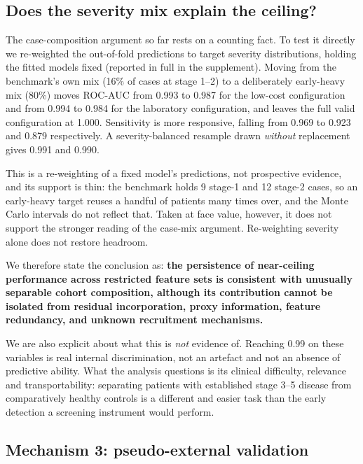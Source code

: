 \documentclass[conference]{IEEEtran}
\begin{document}
\subsection{Does the severity mix explain the ceiling?}
\label{sec:mixsim}

The case-composition argument so far rests on a counting fact. To test it
directly we re-weighted the out-of-fold predictions to target severity
distributions, holding the fitted models fixed
(reported in full in the supplement). Moving from the benchmark's
own mix (16\% of cases at stage 1--2) to a deliberately early-heavy mix
(80\%) moves ROC-AUC from 0.993 to 0.987 for the low-cost configuration and
from 0.994 to 0.984 for the laboratory configuration, and leaves the full
valid configuration at 1.000. Sensitivity is more responsive, falling from
0.969 to 0.923 and 0.879 respectively. A severity-balanced resample drawn
\emph{without} replacement gives 0.991 and 0.990.

This is a re-weighting of a fixed model's predictions, not prospective
evidence, and its support is thin: the benchmark holds 9 stage-1 and 12
stage-2 cases, so an early-heavy target reuses a handful of patients many
times over, and the Monte Carlo intervals do not reflect that. Taken at face
value, however, it does not support the stronger reading of the case-mix
argument. Re-weighting severity alone does not restore headroom.

We therefore state the conclusion as: \textbf{the persistence of near-ceiling
performance across restricted feature sets is consistent with unusually
separable cohort composition, although its contribution cannot be isolated
from residual incorporation, proxy information, feature redundancy, and
unknown recruitment mechanisms.}

We are also explicit about what this is \emph{not} evidence of. Reaching 0.99
on these variables is real internal discrimination, not an artefact and not
an absence of predictive ability. What the analysis questions is its clinical
difficulty, relevance and transportability: separating patients with
established stage 3--5 disease from comparatively healthy controls is a
different and easier task than the early detection a screening instrument
would perform.

\subsection{Mechanism 3: pseudo-external validation}
\label{sec:mech3}
\end{document}
